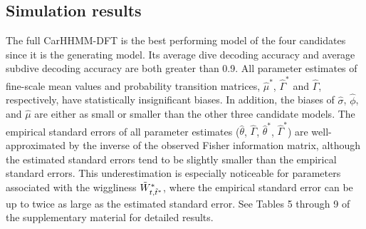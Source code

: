 
\subsection{Simulation results}

The full CarHHMM-DFT is the best performing model of the four candidates since it is the generating model. Its average dive decoding accuracy and average subdive decoding accuracy are both greater than 0.9. All parameter estimates of fine-scale mean values and probability transition matrices, $\hat \mu^*$, $\hat \Gamma^*$ and $\hat \Gamma$, respectively, have statistically insignificant biases. In addition, the biases of $\hat \sigma$, $\hat \phi$, and $\hat \mu$ are either as small or smaller than the other three candidate models. The empirical standard errors of all parameter estimates ($\hat \theta$, $\hat \Gamma$, $\hat \theta^*$, $\hat \Gamma^*$) are well-approximated by the inverse of the observed Fisher information matrix, although the estimated standard errors tend to be slightly smaller than the empirical standard errors. This underestimation is especially noticeable for parameters associated with the wiggliness $\tilde{W}^*_{t,\tilde t^*}$, where the empirical standard error can be up to twice as large as the estimated standard error. See Tables 5 through 9 of the supplementary material for detailed results.

